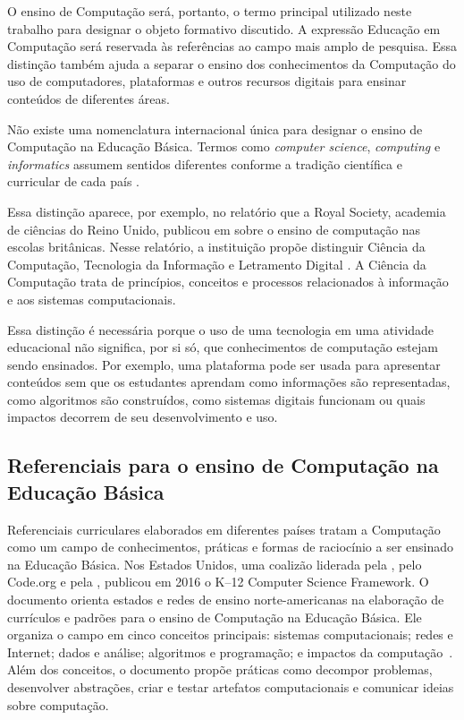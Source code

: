 O ensino de Computação será, portanto, o termo principal utilizado neste trabalho para designar o objeto formativo discutido. A expressão Educação em Computação será reservada às referências ao campo mais amplo de pesquisa. Essa distinção também ajuda a separar o ensino dos conhecimentos da Computação do uso de computadores, plataformas e outros recursos digitais para ensinar conteúdos de diferentes áreas.

Não existe uma nomenclatura internacional única para designar o ensino de Computação na Educação Básica. Termos como \textit{computer science}, \textit{computing} e \textit{informatics} assumem sentidos diferentes conforme a tradição científica e curricular de cada país \cite{heintz2016review}.

Essa distinção aparece, por exemplo, no relatório que a Royal Society, academia de ciências do Reino Unido, publicou em \citeyear{royal2012shut} sobre o ensino de computação nas escolas britânicas. Nesse relatório, a instituição propõe distinguir Ciência da Computação, Tecnologia da Informação e Letramento Digital \cite{royal2012shut}. A Ciência da Computação trata de princípios, conceitos e processos relacionados à informação e aos sistemas computacionais.

Essa distinção é necessária porque o uso de uma tecnologia em uma atividade educacional não significa, por si só, que conhecimentos de computação estejam sendo ensinados. Por exemplo, uma plataforma pode ser usada para apresentar conteúdos sem que os estudantes aprendam como informações são representadas, como algoritmos são construídos, como sistemas digitais funcionam ou quais impactos decorrem de seu desenvolvimento e uso.

\subsection{Referenciais para o ensino de Computação na Educação Básica}
\label{subsec:referenciais-computacao-escolar}

Referenciais curriculares elaborados em diferentes países tratam a Computação como um campo de conhecimentos, práticas e formas de raciocínio a ser ensinado na Educação Básica. Nos Estados Unidos, uma coalizão liderada pela , pelo Code.org e pela , publicou em 2016 o K--12 Computer Science Framework. O documento orienta estados e redes de ensino norte-americanas na elaboração de currículos e padrões para o ensino de Computação na Educação Básica. Ele organiza o campo em cinco conceitos principais: sistemas computacionais; redes e Internet; dados e análise; algoritmos e programação; e impactos da computação~\cite{k2016k}. Além dos conceitos, o documento propõe práticas como decompor problemas, desenvolver abstrações, criar e testar artefatos computacionais e comunicar ideias sobre computação.

